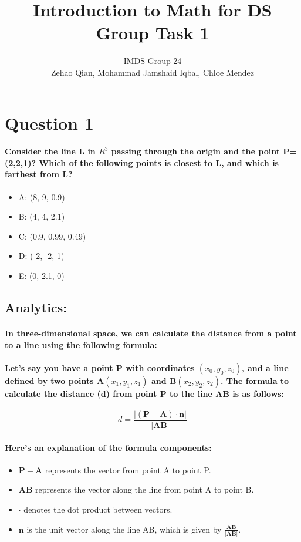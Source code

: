 \documentclass[11pt]{article} %
\title{Introduction to Math for DS Group Task 1}
\author{IMDS Group 24 \\ Zehao Qian, Mohammad Jamshaid Iqbal, Chloe Mendez}
\begin{document}
\maketitle
% 
% 
% 
\section{Question 1}
\paragraph{Consider the line L in $R^3$ passing through the origin and the point P=(2,2,1)? Which of the following points is closest to L, and which is farthest from L?}
\begin{itemize}
    \item A: (8, 9, 0.9)
    \item B: (4, 4, 2.1)
    \item C: (0.9, 0.99, 0.49)
    \item D: (-2, -2, 1)
    \item E: (0, 2.1, 0)
\end{itemize}

\subsection{Analytics:}
\paragraph{In three-dimensional space, we can calculate the distance from a point to a line using the following formula:}
\paragraph{Let's say you have a point P with coordinates $(x_0, y_0, z_0)$, and a line defined by two points A$(x_1, y_1, z_1)$ and B$(x_2, y_2, z_2)$. The formula to calculate the distance (d) from point P to the line AB is as follows:}
% 
% 
$$ d = \frac{|(\mathbf{P} - \mathbf{A}) \cdot \mathbf{n}|}{|\mathbf{AB}|} $$
% 
% 
\paragraph{Here's an explanation of the formula components:}
% 
% 
\begin{itemize}
    \item \(\mathbf{P} - \mathbf{A}\) represents the vector from point A to point P.
    \item \(\mathbf{AB}\) represents the vector along the line from point A to point B.
    \item \(\cdot\) denotes the dot product between vectors.
    \item \(\mathbf{n}\) is the unit vector along the line AB, which is given by \(\frac{\mathbf{AB}}{|\mathbf{AB}|}\).
\end{itemize}
% 
% 

% 
% 
% 
% 
% 
% 
% 
% 
% 
% 
% 
% 
% 
% 
% 
% 
% 
% 
% 
% 
% 
\end{document}

